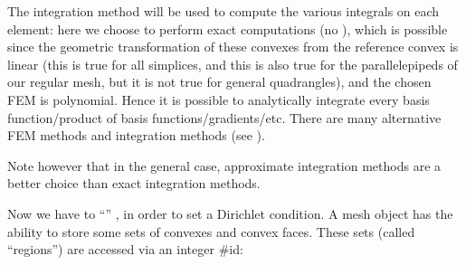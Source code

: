 \documentclass[a4paper,11pt,english]{sphinxmanual}
\begin{document}
The integration method will be used to compute the various integrals on each
element: here we choose to perform exact computations (no ), which is possible since the geometric transformation of these convexes
from the reference convex is linear (this is true for all simplices, and this is
also true for the parallelepipeds of our regular mesh, but it is not true for
general quadrangles), and the chosen FEM is polynomial. Hence it is possible to
analytically integrate every basis function/product of basis
functions/gradients/etc. There are many alternative FEM methods and integration
methods (see ).

Note however that in the general case, approximate integration methods are a
better choice than exact integration methods.

Now we have to  “” , in order to
set a Dirichlet condition. A mesh object has the ability to store some sets of
convexes and convex faces. These sets (called “regions”) are accessed via an
integer \#id:

\begin{sphinxVerbatim}[commandchars=\\\{\}]
 
   
 
    
   \PYG{p}{[}\PYG{p}{]} 
\end{sphinxVerbatim}
\end{document}
